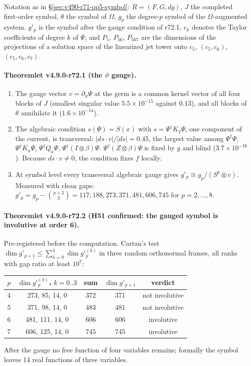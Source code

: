 Notation as in \S\ref{sec:v490-r71-op5-symbol}: \(R=(F,G,dg)\), \(J\) the completed first-order symbol, \(\theta\) the
symbol of \(\Omega\), \(g_p\) the degree-\(p\) symbol of the \(\Omega\)-augmented system.  \(g'_p\) is the symbol after the
gauge condition of r72.1, \(c_k\) denotes the Taylor coefficients of degree \(k\) of \(\Psi\), and \(P_{5}\), \(P_{56}\),
\(P_{567}\) are the dimensions of the projections of a solution space of the linearized jet tower onto \(c_5\),
\((c_5,c_6)\), \((c_5,c_6,c_7)\).

\paragraph{Theoremlet v4.9.0-r72.1 (the \(\vartheta\) gauge).}
\begin{enumerate}[leftmargin=2em]
\item[(a)] The gauge vector \(v=\partial_\vartheta\Psi\) at the germ is a common kernel vector of all four blocks of \(J\)
(smallest singular value \(5.5\times10^{-15}\) against \(0.13\)), and all blocks of \(\theta\) annihilate it
(\(1.6\times10^{-14}\)).
\item[(b)] The algebraic condition \(s(\Psi)=S(x)\) with \(s=\Psi^\dagger K_2\Psi\), one component of the current, is
transversal: \(|ds\cdot v|/|ds|=0.45\), the largest value among \(\Psi^\dagger\Psi\), \(\Psi^\dagger K_a\Psi\),
\(\Psi^\dagger Q_a\Psi\), \(\Psi^\dagger(I\otimes\beta)\Psi\).  \(\Psi^\dagger(Z\otimes\beta)\Psi\) is fixed by \(g\) and blind
(\(3.7\times10^{-16}\)).  Because \(ds\cdot v\neq0\), the condition fixes \(f\) locally.
\item[(c)] At symbol level every transversal algebraic gauge gives \(g'_p\cong g_p/(S^p\otimes v)\).  Measured with clean
gaps: \(g'_p=g_p-\binom{p+3}{3}=117,188,273,371,481,606,745\) for \(p=2,\dots,8\).
\end{enumerate}

\paragraph{Theoremlet v4.9.0-r72.2 (H51 confirmed: the gauged symbol is involutive at order 6).}
Pre-registered before the computation.  Cartan's test \(\dim g'_{p+1}\le\sum_{k=0}^{3}\dim g'^{(k)}_p\) in three random
orthonormal frames, all ranks with gap ratio at least \(10^7\):
\begin{center}
\small
\begin{tabular}{@{}ccccc@{}}
\toprule
\(p\) & \(\dim g'^{(k)}_p\), \(k=0..3\) & sum & \(\dim g'_{p+1}\) & verdict\\
\midrule
4 & 273, 85, 14, 0 & 372 & 371 & not involutive\\
5 & 371, 98, 14, 0 & 483 & 481 & not involutive\\
6 & 481, 111, 14, 0 & 606 & 606 & involutive\\
7 & 606, 125, 14, 0 & 745 & 745 & involutive\\
\bottomrule
\end{tabular}
\end{center}
After the gauge no free function of four variables remains; formally the symbol leaves 14 real functions of three variables.

